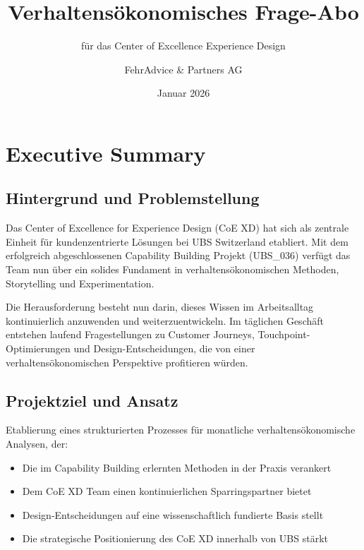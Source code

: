 \documentclass{fehradvice-report}
\title{Verhaltensökonomisches Frage-Abo}
\subtitle{für das Center of Excellence Experience Design}
\author{FehrAdvice \& Partners AG}
\date{Januar 2026}
\begin{document}
\maketitle

\tableofcontents
\newpage

\section{Executive Summary}

\subsection{Hintergrund und Problemstellung}

Das Center of Excellence for Experience Design (CoE XD) hat sich als zentrale Einheit für kundenzentrierte Lösungen bei UBS Switzerland etabliert. Mit dem erfolgreich abgeschlossenen Capability Building Projekt (UBS\_036) verfügt das Team nun über ein solides Fundament in verhaltensökonomischen Methoden, Storytelling und Experimentation.

Die Herausforderung besteht nun darin, dieses Wissen im Arbeitsalltag kontinuierlich anzuwenden und weiterzuentwickeln. Im täglichen Geschäft entstehen laufend Fragestellungen zu Customer Journeys, Touchpoint-Optimierungen und Design-Entscheidungen, die von einer verhaltensökonomischen Perspektive profitieren würden.

\subsection{Projektziel und Ansatz}

\begin{fainfobox}
Etablierung eines strukturierten Prozesses für monatliche verhaltensökonomische Analysen, der:
\begin{itemize}
    \item Die im Capability Building erlernten Methoden in der Praxis verankert
    \item Dem CoE XD Team einen kontinuierlichen Sparringspartner bietet
    \item Design-Entscheidungen auf eine wissenschaftlich fundierte Basis stellt
    \item Die strategische Positionierung des CoE XD innerhalb von UBS stärkt
\end{itemize}
\end{fainfobox}
\end{document}
